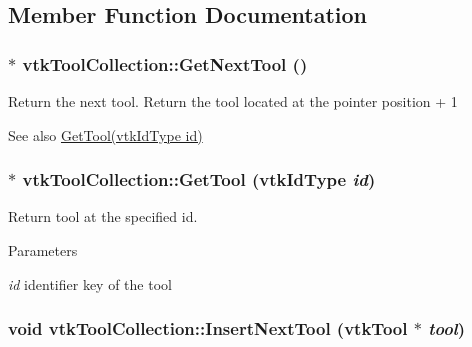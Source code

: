 \subsection{Member Function Documentation}
\hypertarget{classvtkToolCollection_ad58c5c348bd19de77143836948761d61}{
\subsubsection[{GetNextTool}]{ $\ast$ vtkToolCollection::GetNextTool ()}}
\label{classvtkToolCollection_ad58c5c348bd19de77143836948761d61}


Return the next tool. Return the tool located at the pointer position + 1 \begin{DoxySeeAlso}{See also}
\hyperlink{classvtkToolCollection_aaf3ad76ac0105f5f83775f189a56046b}{GetTool(vtkIdType id)} 
\end{DoxySeeAlso}
\hypertarget{classvtkToolCollection_aaf3ad76ac0105f5f83775f189a56046b}{
\subsubsection[{GetTool}]{ $\ast$ vtkToolCollection::GetTool (vtkIdType {\em id})}}
\label{classvtkToolCollection_aaf3ad76ac0105f5f83775f189a56046b}


Return tool at the specified id. 
\begin{DoxyParams}{Parameters}
\item[{\em id}]identifier key of the tool \end{DoxyParams}
\hypertarget{classvtkToolCollection_a77f6ddcba9da4caf9bd9204f20c1c6f2}{
\subsubsection[{InsertNextTool}]{\setlength{\rightskip}{0pt plus 5cm}void vtkToolCollection::InsertNextTool ({\bf vtkTool} $\ast$ {\em tool})}}
\label{classvtkToolCollection_a77f6ddcba9da4caf9bd9204f20c1c6f2}


